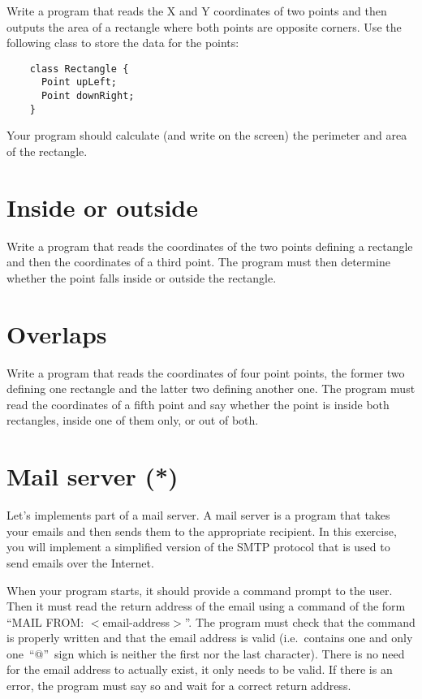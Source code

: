 \documentclass{article}
\begin{document}
Write a program that reads the X and Y coordinates of two points and
then outputs the area of a rectangle where both points are opposite
corners. Use the following class
to store the data for the points: 

\begin{verbatim}
    class Rectangle {
      Point upLeft;
      Point downRight;
    }
\end{verbatim}

Your program should calculate (and write on the screen) the perimeter
and area of the rectangle. 

\section{Inside or outside}
\label{sec:inside-or-outside}

Write a program that reads the coordinates of the two points defining a
rectangle and then the coordinates of a third point. The program must
then determine whether the point falls inside or outside the
rectangle. 

\section{Overlaps}
\label{sec:insideinside}

Write a program that reads the coordinates of four point points, the
former two defining one rectangle and the latter two defining
another one. The program must read the coordinates of a fifth point and
say whether the point is inside both rectangles, inside one of them
only, or out of both. 


\section{Mail server (*)}
\label{sec:mail-server}

Let's implements part of a mail server. A mail server is a program
that takes your emails and then sends them to the appropriate
recipient. In this exercise, you will implement a simplified version
of the SMTP protocol that is used to send emails over the Internet. 

When your program starts, it should provide a command prompt to the
user. Then it must read the return address of the email using a
command of the form ``MAIL FROM: $<$email-address$>$''. The program
must check that the command is properly written and that the email
address is valid (i.e.~contains one and only one~``@''~sign 
which is neither the
first nor the last character). There is no need for the email address
to actually exist, it only needs to be valid. If there is an error,
the program must 
say so and wait for a correct return address.
\end{document}
